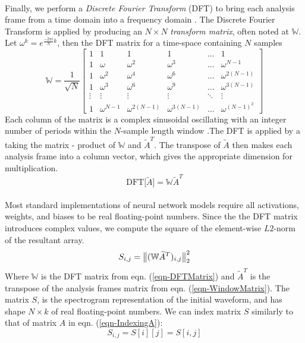 \documentclass[12pt,letterpaper]{article}
\begin{document}
\paragraph*{}Finally, we perform a \textit{Discrete Fourier Transform} (DFT) to bring each analysis frame from a time domain into a frequency domain \cite{Olson,Peatross}. The Discrete Fourier Transform is applied by producing an $N \times N$ \textit{transform matrix}, often noted at $\mathbb{W}$. Let $\omega^k = e^{\frac{-2\pi i}{N}k}$, then the DFT matrix for a time-space containing $N$ samples
\begin{equation}
\label{eqn-DFTMatrix}
\mathbb{W} = \frac{1}{\sqrt{N}}
\begin{bmatrix}
1 & 1 & 1 & 1 & \hdots & 1 \\
1 & \omega		& \omega^2 & \omega^3 & \hdots & \omega^{N-1} \\
1 & \omega^2	& \omega^4 & \omega^6 & \hdots & \omega^{2(N-1)} \\
1 & \omega^3	& \omega^6 & \omega^9 & \hdots & \omega^{3(N-1)} \\
\vdots & \vdots & \vdots & \vdots & \ddots & \vdots \\
1 & \omega^{N-1} & \omega^{2(N-1)} & \omega^{3(N-1)} & \hdots & \omega^{(N-1)^2}
\end{bmatrix}
\end{equation}
Each column of the matrix is a complex sinusoidal oscillating with an integer number of periods within the $N$-sample length window \cite{Short,Peatross}.The DFT is applied by a taking the matrix - product of $\mathbb{W}$ and $\widetilde{A}^T$. The transpose of $\widetilde{A}$ then makes each analysis frame into a column vector, which gives the appropriate dimension for multiplication.
\begin{equation}
\label{eqn-DFT}
\text{DFT}\big[ \widetilde{A} \big] = \mathbb{W}\widetilde{A}^T
\end{equation}

\paragraph*{}Most standard implementations of neural network models require all activations, weights, and biases to be real floating-point numbers. Since the the DFT matrix introduces complex values, we compute the square of the element-wise $L2$-norm of the resultant array.
\begin{equation}
\label{eqn-Spectrogram}
S_{i,j} = \big{\lVert} (\mathbb{W}\widetilde{A}^T)_{i,j} \big{\rVert}_{2}^{2}
\end{equation}
Where $\mathbb{W}$ is the DFT matrix from eqn. (\ref{eqn-DFTMatrix}) and $\widetilde{A}^T$ is the transpose of the analysis frames matrix from eqn. (\ref{eqn-WindowMatrix}). The matrix $S$, is the spectrogram representation of the initial waveform, and has shape $N \times k$ of real floating-point numbers. We can index matrix $S$ similarly to that of matrix $A$ in eqn. (\ref{eqn-IndexingA}):
\begin{equation}
\label{eqn-IndexingS}
S_{i,j} = S[i][j] = S[i,j]
\end{equation}
\end{document}
